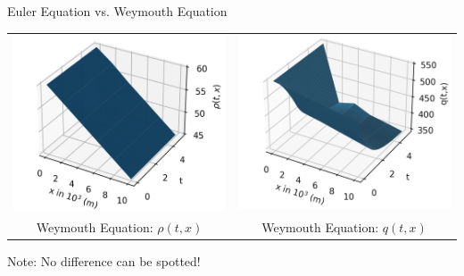 \documentclass[8pt]{beamer}
\begin{document}
\begin{frame}{Euler Equation vs. Weymouth Equation}
\begin{center}
 \begin{tabular}{cc}
  \includegraphics[height=0.3\textheight]{images/Wey_Simpl_P.png}
  &
  \includegraphics[height=0.3\textheight]{images/Wey_Simpl_Q_new.png}
   \\                                                     
Weymouth Equation: $\rho(t,x)$ & Weymouth Equation: $q(t,x)$
 \end{tabular}
 \end{center}
 \textcolor{bluepurp}{Note:} No difference can be spotted!
\end{frame}
\end{document}

